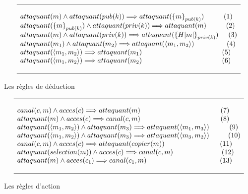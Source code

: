 \documentclass[10pt,a4paper]{article}
\begin{document}
\[
\begin{array}{l}
\hline
\\
attaquant(m)\wedge attaquant(pub(k))\Longrightarrow attaquant({\lbrace m\rbrace}_{pub(k)})\hspace{1cm}(1)\\
attaquant({\lbrace m\rbrace}_{pub(k)}) \wedge attaquant(priv(k))\Longrightarrow attaquant(m)\hspace{1cm}(2)\\ 
attaquant(m)\wedge attaquant(priv(k))\Longrightarrow attaquant({\lbrace H|m|\rbrace}_{priv(k)})\hspace{0.5cm}(3)\\
attaquant(m_{1})\wedge attaquant(m_{2})\Longrightarrow attaquant(\langle m_{1},m_{2}\rangle)\hspace{1.65cm}(4)\\ 
attaquant(\langle m_{1},m_{2}\rangle)\Longrightarrow attaquant(m_{1})\hspace{4cm}\,(5)\\
attaquant(\langle m_{1},m_{2}\rangle)\Longrightarrow attaquant(m_{2})\hspace{4cm}\,(6)\\ 
 

\\
\hline  
  \end{array}
\]
\caption{Les règles de déduction}
\medskip

\[
\begin{array}{l}
\hline
\\
canal(c,m)\wedge acces(c)\Longrightarrow attaquant(m)\hspace{4cm}\,(7)\\
attaquant(m)\wedge acces(c)\Longrightarrow canal(c,m)\hspace{4cm}\,(8)\\ 
attaquant(\langle m_{1},m_{2}\rangle)\wedge attaquant(m_{3})\Longrightarrow attaquant(\langle m_{1},m_{3}\rangle)\hspace{0.9cm}\,\,(9)\\
attaquant(\langle m_{1},m_{2}\rangle)\wedge attaquant(m_{3})\Longrightarrow attaquant(\langle m_{3},m_{2}\rangle)\hspace{0.9cm}\,(10)\\
canal(c,m)\wedge acces(c)\Longrightarrow attaquant(copier(m))\hspace{2.8cm}(11)\\
attaquant(selection(m))\wedge acces(c)\Longrightarrow canal(c,m)\hspace{2.4cm}\,(12)\\
attaquant(m)\wedge acces(c_{1})\Longrightarrow canal(c_{1},m)\hspace{3.65cm}\,(13)\\

\\
\hline  
  \end{array}
\]
\caption{Les règles d'action}
\newpage
 
\end{document}

